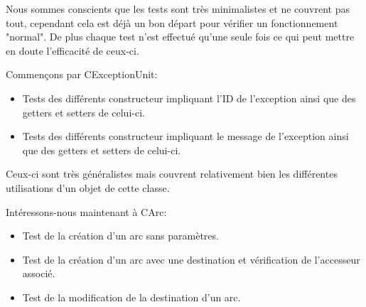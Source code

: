 		Nous sommes conscients que les tests sont très minimalistes et ne couvrent pas tout, cependant cela est déjà un bon départ pour vérifier un fonctionnement "normal". De plus chaque test n'est effectué qu'une seule fois ce qui peut mettre en doute l'efficacité de ceux-ci.
		
		Commençons par CExceptionUnit:
		\begin{itemize}
			\item Tests des différents constructeur impliquant l'ID de l'exception ainsi que des getters et setters de celui-ci.
			\item Tests des différents constructeur impliquant le message de l'exception ainsi que des getters et setters de celui-ci.\\
		\end{itemize}
		Ceux-ci sont très généralistes mais couvrent relativement bien les différentes utilisations d'un objet de cette classe.
		
		Intéressons-nous maintenant à CArc:
		\begin{itemize}
			\item Test de la création d'un arc sans paramètres.
			\item Test de la création d'un arc avec une destination et vérification de l'accesseur associé.
			\item Test de la modification de la destination d'un arc.
		\end{itemize}
		

